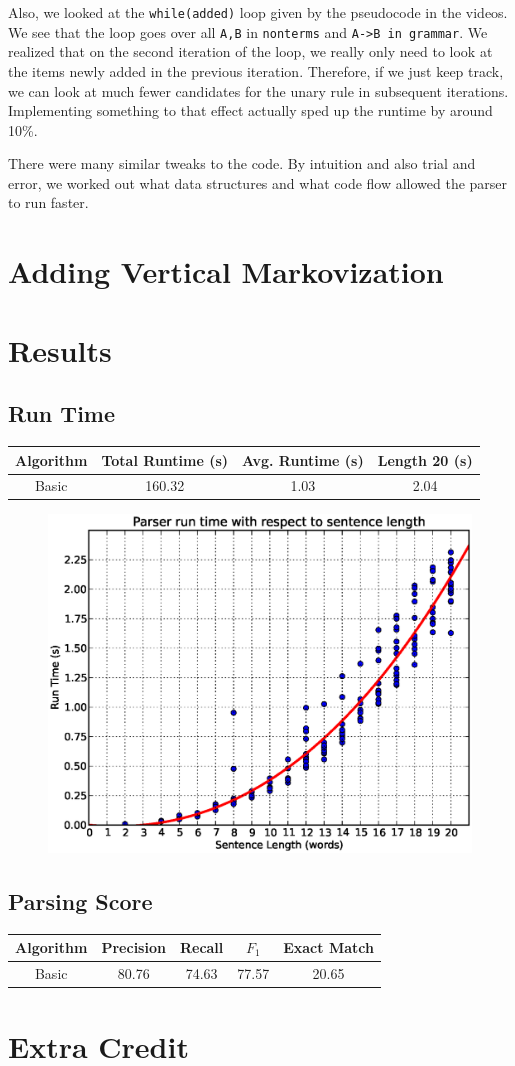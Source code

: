 \documentclass[12pt]{article}
\begin{document}
Also, we looked at the \texttt{while(added)} loop given by the pseudocode in the videos. We see that the loop goes over all \texttt{A,B} in \texttt{nonterms} and \texttt{A->B in grammar}. We realized that on the second iteration of the loop, we really only need to look at the items newly added in the previous iteration. Therefore, if we just keep track, we can look at much fewer candidates for the unary rule in subsequent iterations. Implementing something to that effect actually sped up the runtime by around 10\%.

There were many similar tweaks to the code. By intuition and also trial and error, we worked out what data structures and what code flow allowed the parser to run faster.
\section{Adding Vertical Markovization}

\section{Results}
\subsection{Run Time}
\begin{center}
\begin{tabular}{|c|c|c|c|}
\hline
Algorithm & Total Runtime (s) & Avg. Runtime (s) & Length 20 (s)\\\hline
Basic & 160.32 & 1.03 & 2.04 \\\hline

\end{tabular}
\end{center}
\begin{figure}[H]
\centering
\includegraphics[width=0.5\linewidth]{./stats/runtime}
\end{figure}
\subsection{Parsing Score}
\begin{center}
\begin{tabular}{|c|c|c|c|c|}
\hline
Algorithm & Precision & Recall & $F_1$ & Exact Match \\\hline
Basic & 80.76 & 74.63 & 77.57 & 20.65\\\hline

\end{tabular}
\end{center}
\section{Extra Credit}
\end{document}
